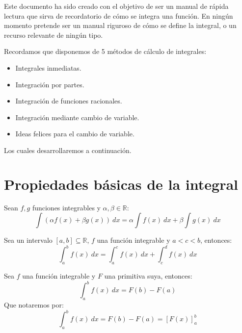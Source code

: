 Este documento ha sido creado con el objetivo de ser un manual de rápida lectura que sirva de recordatorio de cómo se integra una función. En ningún momento pretende ser un manual riguroso de cómo se define la integral, o un recurso relevante de ningún tipo.

\noindent
Recordamos que disponemos de 5 métodos de cálculo de integrales:
\begin{itemize}
    \item Integrales inmediatas.
    \item Integración por partes.
    \item Integración de funciones racionales.
    \item Integración mediante cambio de variable.
    \item Ideas felices para el cambio de variable.
\end{itemize}
Los cuales desarrollaremos a continuación.

\section{Propiedades básicas de la integral}
\begin{prop}
    Sean $f, g$ funciones integrables y $\alpha, \beta \in \mathbb{R}$:
    \begin{equation*}
        \int (\alpha f(x) + \beta g(x))~dx = \alpha \int f(x)~dx  + \beta \int g(x)~dx 
    \end{equation*}
\end{prop}

\begin{prop}
    Sea un intervalo $[a, b] \subseteq \mathbb{R}$, $f$ una función integrable y $a < c < b$, entonces:
    \begin{equation*}
        \int_{a}^{b} f(x)~dx = \int_{a}^{c} f(x)~dx + \int_{c}^{d} f(x)~dx 
    \end{equation*}
\end{prop}

\begin{prop}
    Sea $f$ una función integrable y $F$ una primitiva suya, entonces:
    \begin{equation*}
        \int_{a}^{b} f(x)~dx = F(b) - F(a)
    \end{equation*}
    Que notaremos por:
    \begin{equation*}
        \int_{a}^{b} f(x)~dx = F(b) - F(a) = {[F(x)]}^b_a
    \end{equation*}
\end{prop}

